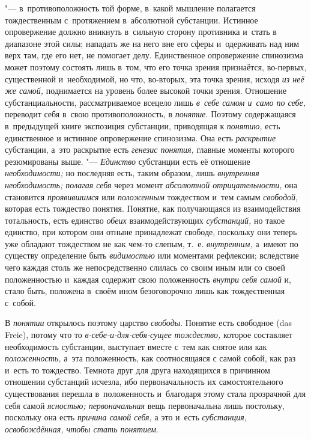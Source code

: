 "--- в~противоположность той форме, в~какой мышление полагается
тождественным с~протяжением в~абсолютной субстанции. Истинное опровержение
должно вникнуть в~сильную сторону противника и~стать в
диапазоне этой силы; нападать же на него вне его сферы и~одерживать над ним
верх там, где его нет, не помогает делу. Единственное опровержение
спинозизма может поэтому состоять лишь в~том, что его точка зрения
признаётся, во-первых, существенной и~необходимой, но что, во-вторых, эта
точка зрения, исходя {\em из неё же самой,} поднимается на уровень более
высокой точки зрения. Отношение субстанциальности, рассматриваемое всецело
лишь {\em в~себе самом и~само по себе,} переводит себя в~свою
противоположность, в {\em понятие}. Поэтому содержащаяся в~предыдущей книге
экспозиция субстанции, приводящая к {\em понятию,} есть единственное и
истинное опровержение спинозизма. Она есть {\em раскрытие} субстанции, а~это
раскрытие есть {\em генезис понятия,} главные моменты которого резюмированы
выше. "--- {\em Единство} субстанции есть её отношение {\em необходимости;}
но последняя есть, таким образом, лишь {\em внутренняя необходимость;
полагая себя} через момент {\em абсолютной отрицательности,} она
становится {\em проявившимся} или {\em положенным} тождеством и~тем самым
{\em свободой,} которая есть тождество понятия. Понятие, как получающаяся из
взаимодействия тотальность, есть единство {\em обеих} взаимодействующих
{\em субстанций,} но такое единство, при котором они отныне принадлежат
свободе, поскольку они теперь уже обладают тождеством не как чем-то слепым,
т.~е. {\em внутренним,} а~имеют по существу определение быть {\em видимостью}
или моментами рефлексии; вследствие чего каждая столь же непосредственно
слилась со своим иным или со своей положенностью и~каждая содержит свою
положенность {\em внутри себя самой} и, стало быть, положена в~своём ином
безоговорочно лишь как тождественная с~собой.

В {\em понятии} открылось поэтому царство {\em свободы}. Понятие есть
свободное (das Freie), потому что то {\em в-себе-и-для-себя-сущее тождество,}
которое составляет необходимость субстанции, выступает вместе с~тем как
снятое или как {\em положенность,} а~эта положенность, как соотносящаяся с
самой собой, как раз и~есть то тождество. Темнота друг для друга находящихся
в причинном отношении субстанций исчезла, ибо первоначальность их
самостоятельного существования перешла в~положенность и~благодаря этому
стала прозрачной для себя самой {\em ясностью; первоначальная}
вещь
первоначальна лишь постольку, поскольку она есть {\em причина самой себя,}
а это и~есть {\em субстанция, освобождённая, чтобы стать понятием}.

